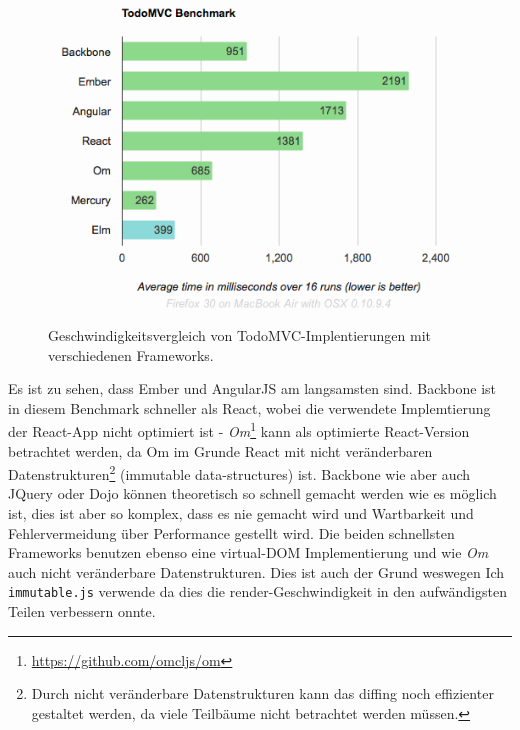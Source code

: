 \documentclass[12pt,twoside]{book}
\begin{document}
\begin{figure}[H]
    \centering
    \includegraphics[width=1.0\textwidth]{images/virtual_dom.png}
    \caption{Geschwindigkeitsvergleich von TodoMVC-Implentierungen mit verschiedenen Frameworks.}
    \label{fig:awesome_image}
\end{figure}

Es ist zu sehen, dass Ember und AngularJS am langsamsten sind. Backbone ist in diesem Benchmark schneller als React, wobei die verwendete Implemtierung der React-App nicht optimiert ist - \textit{Om}\footnote{\url{https://github.com/omcljs/om}} kann als optimierte React-Version betrachtet werden, da Om im Grunde React mit nicht veränderbaren Datenstrukturen\footnote{Durch nicht veränderbare Datenstrukturen kann das diffing noch effizienter gestaltet werden, da viele Teilbäume nicht betrachtet werden müssen.} (immutable data-structures) ist. Backbone wie aber auch JQuery oder Dojo können theoretisch so schnell gemacht werden wie es möglich ist, dies ist aber so komplex, dass es nie gemacht wird und Wartbarkeit und Fehlervermeidung über Performance gestellt wird.
Die beiden schnellsten Frameworks benutzen ebenso eine virtual-DOM Implementierung und wie \textit{Om} auch nicht veränderbare Datenstrukturen.
Dies ist auch der Grund weswegen Ich \texttt{immutable.js} verwende da dies die render-Geschwindigkeit in den aufwändigsten Teilen verbessern onnte.
\end{document}

